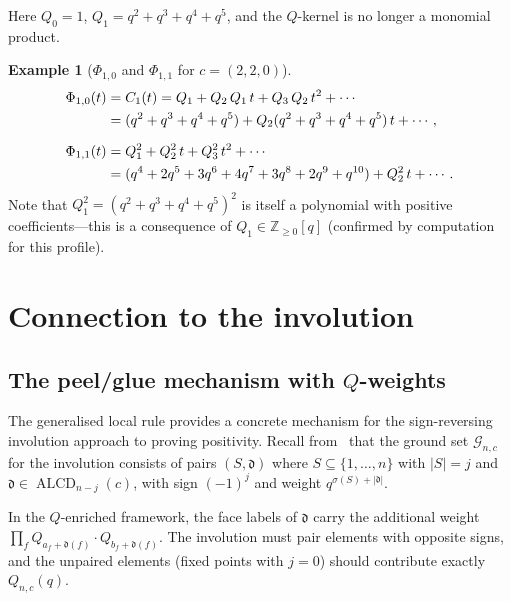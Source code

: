 \documentclass[11pt]{article}
\newcommand{\Z}{\mathbb{Z}}
\newcommand{\ALCD}{\operatorname{ALCD}}
\theoremstyle{plain}
\theoremstyle{definition}
\newtheorem{example}[theorem]{Example}
\begin{document}
Here $Q_0 = 1$, $Q_1 = q^2 + q^3 + q^4 + q^5$, and the
$Q$-kernel is no longer a monomial product.

\begin{example}[$\Phi_{1,0}$ and $\Phi_{1,1}$ for $c = (2,2,0)$]
\label{ex:Phi-d4}
\begin{align}
  \Phi_{1,0}(t) &= C_1(t)
  = Q_1 + Q_2\, Q_1\, t + Q_3\, Q_2\, t^2 + \cdots
    \notag \\
  &= (q^2 + q^3 + q^4 + q^5)
    + Q_2(q^2 + q^3 + q^4 + q^5)\, t + \cdots,
    \label{eq:Phi10-d4} \\[6pt]
  \Phi_{1,1}(t)
  &= Q_1^2 + Q_2^2\, t + Q_3^2\, t^2 + \cdots
    \notag \\
  &= (q^4 + 2q^5 + 3q^6 + 4q^7 + 3q^8 + 2q^9 + q^{10})
    + Q_2^2\, t + \cdots.
    \label{eq:Phi11-d4}
\end{align}
Note that $Q_1^2 = (q^2 + q^3 + q^4 + q^5)^2$ is itself a
polynomial with positive coefficients---this is a consequence of
$Q_1 \in \Z_{\geq 0}[q]$ (confirmed by computation for this
profile).
\end{example}


\section{Connection to the involution}
\label{sec:connection-involution}

\subsection{The peel/glue mechanism with $Q$-weights}

The generalised local rule provides a concrete mechanism for the
sign-reversing involution approach to proving positivity.  Recall
from~\cite{UNDERLYING_SET} that the ground set
$\mathcal{G}_{n,c}$ for the involution consists of pairs
$(S, \mathfrak{d})$ where $S \subseteq \{1, \ldots, n\}$ with
$|S| = j$ and $\mathfrak{d} \in \ALCD_{n-j}(c)$, with sign
$(-1)^j$ and weight $q^{\sigma(S) + |\mathfrak{d}|}$.

In the $Q$-enriched framework, the face labels of $\mathfrak{d}$
carry the additional weight $\prod_f Q_{a_f + \mathfrak{d}(f)}
\cdot Q_{b_f + \mathfrak{d}(f)}$.  The involution must pair
elements with opposite signs, and the unpaired elements (fixed
points with $j = 0$) should contribute exactly $Q_{n,c}(q)$.
\end{document}
